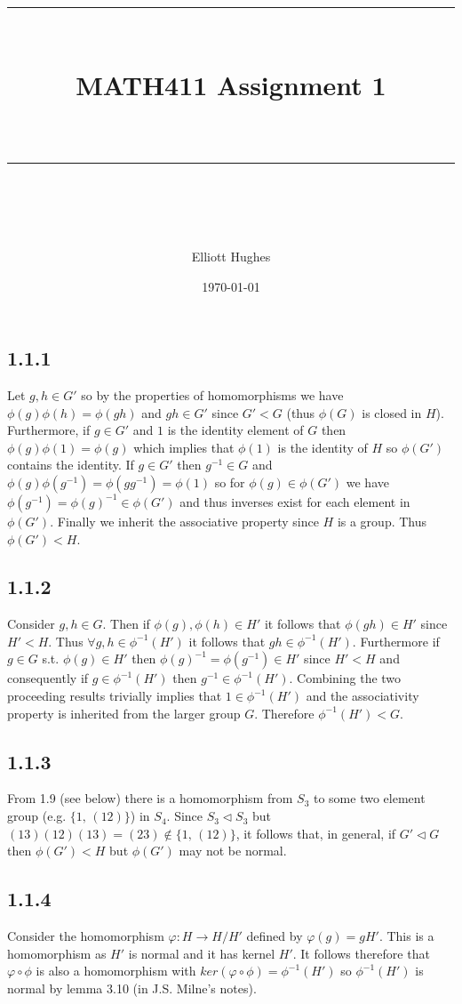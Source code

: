 \documentclass{article}
\title{	
	\normalfont\normalsize 
	\rule{\linewidth}{0.5pt}\\ %
	\vspace{14pt} %
	{\LARGE MATH411 Assignment 1\\ %
    \large \textit{} \\}
	\vspace{6pt} %
	\rule{\linewidth}{1pt}\\ %
}
\author{Elliott Hughes}
\date{\normalsize\today}
\begin{document}
\maketitle

\subsection*{1.1.1}
Let $g,h \in G'$ so by the properties of homomorphisms we have $\phi(g)\phi(h) = \phi(gh)$ and 
$gh \in G'$ since $G' < G$ (thus $\phi(G)$ is closed in $H$). Furthermore, if $g \in G'$ and $1$ is 
the identity element of $G$ then $\phi(g)\phi(1) = \phi(g)$ which 
implies that $\phi(1)$ is the identity of $H$ so $\phi(G')$ contains the identity.
If $g \in G'$ then $g^{-1} \in G$ and $\phi(g)\phi(g^{-1}) = \phi(gg^{-1}) = \phi(1)$ so 
for $\phi(g) \in \phi(G')$ we have $\phi(g^{-1}) = \phi(g)^{-1} \in \phi(G')$ and thus inverses exist 
for each element in $\phi(G')$. Finally we inherit the associative property since $H$ is a group. 
Thus $\phi(G') < H$.

\subsection*{1.1.2}
Consider $g,h \in G$. Then if $\phi(g), \phi(h) \in H'$ it follows that $\phi(gh) \in H'$ since 
$H' < H$. Thus $\forall g,h \in \phi^{-1}(H')$ it follows that $gh \in \phi^{-1}(H')$. Furthermore 
if $g \in G$ s.t. $\phi(g) \in H'$ then $\phi(g)^{-1} = \phi(g^{-1}) \in H'$ since $H' < H$ and 
consequently if $g \in \phi^{-1}(H')$ then $g^{-1} \in \phi^{-1}(H')$. Combining the two 
proceeding results
trivially implies that $1 \in \phi^{-1}(H')$ and the associativity property is inherited from the 
larger group $G$. Therefore $\phi^{-1}(H') < G$.

\subsection*{1.1.3}
From 1.9 (see below) there is a homomorphism from $S_3$ to some two element group (e.g. $\{1,\,(12)\}$) in $S_4$. Since 
$S_3  \triangleleft S_3$ but $(13)(12)(13) = (23) \notin \{1,\,(12)\}$, it follows that, in general, 
if $G' \triangleleft G$ then $\phi(G') < H$ but $\phi(G')$ may not be normal.

\subsection*{1.1.4}
Consider the homomorphism $\varphi: H \rightarrow H/H'$ defined by $\varphi(g) = gH'$. This is a 
homomorphism as $H'$ is normal and it has kernel $H'$. It follows therefore that $\varphi \circ \phi$ 
is also a homomorphism with $ker(\varphi \circ \phi) = \phi^{-1}(H')$ so $\phi^{-1}(H')$ is normal 
by lemma 3.10 (in J.S. Milne's notes).
\end{document}
